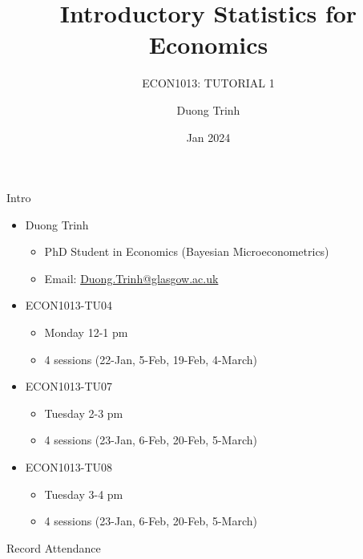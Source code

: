 \documentclass[
  11pt,
  ignorenonframetext,
]{beamer}
\title{Introductory Statistics for Economics}
\subtitle{ECON1013: TUTORIAL 1}
\author{Duong Trinh}
\date{Jan 2024}
\institute{University of Glasgow}
\providecommand{\tightlist}{%
  \setlength{\itemsep}{0pt}\setlength{\parskip}{0pt}}
\begin{document}
\frame{\titlepage}

\begin{frame}{Intro}
\protect\hypertarget{intro}{}
\begin{itemize}
\tightlist
\item
  Duong Trinh

  \begin{itemize}
  \tightlist
  \item
    PhD Student in Economics (Bayesian Microeconometrics)
  \item
    Email: \underline{Duong.Trinh@glasgow.ac.uk}
  \end{itemize}
\end{itemize}

\vspace{3mm}

\begin{itemize}
\tightlist
\item
  ECON1013-TU04

  \begin{itemize}
  \tightlist
  \item
    Monday 12-1 pm
  \item
    4 sessions (22-Jan, 5-Feb, 19-Feb, 4-March)
  \end{itemize}
\item
  ECON1013-TU07

  \begin{itemize}
  \tightlist
  \item
    Tuesday 2-3 pm
  \item
    4 sessions (23-Jan, 6-Feb, 20-Feb, 5-March)
  \end{itemize}
\item
  ECON1013-TU08

  \begin{itemize}
  \tightlist
  \item
    Tuesday 3-4 pm
  \item
    4 sessions (23-Jan, 6-Feb, 20-Feb, 5-March)
  \end{itemize}
\end{itemize}
\end{frame}

\begin{frame}{Record Attendance}
\protect\hypertarget{record-attendance}{}
\end{frame}
\end{document}
